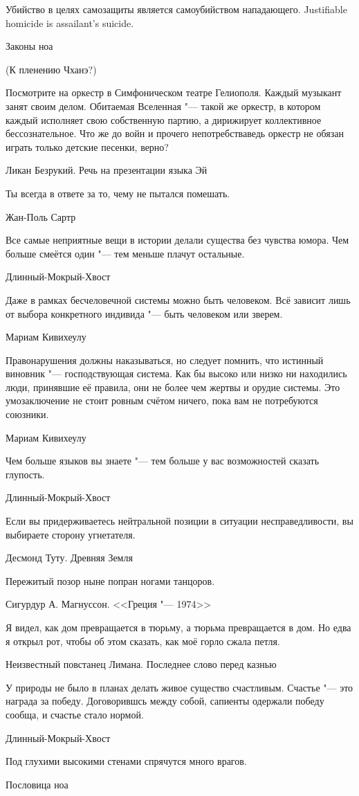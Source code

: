 \epigraph{
{Убийство в целях самозащиты является самоубийством нападающего.}
{Justifiable homicide is assailant's suicide.}
}{Законы ноа}

(К пленению Чханэ?)

\epigraph
{Посмотрите на оркестр в Симфоническом театре Гелиополя.
Каждый музыкант занят своим делом.
Обитаемая Вселенная "--- такой же оркестр, в котором каждый исполняет свою собственную партию, а дирижирует коллективное бессознательное.
Что же до войн и прочего непотребства\ldotst ведь оркестр не обязан играть только детские песенки, верно?}
{Ликан Безрукий.
Речь на презентации языка Эй}

\epigraph
{Ты всегда в ответе за то, чему не пытался помешать.}
{Жан-Поль Сартр}

\epigraph
{Все самые неприятные вещи в истории делали существа без чувства юмора.
Чем больше смеётся один "--- тем меньше плачут остальные.}
{Длинный-Мокрый-Хвост}

\epigraph
{Даже в рамках бесчеловечной системы можно быть человеком.
Всё зависит лишь от выбора конкретного индивида "--- быть человеком или зверем.}
{Мариам Кивихеулу}

\epigraph
{Правонарушения должны наказываться, но следует помнить, что истинный виновник "--- господствующая система.
Как бы высоко или низко ни находились люди, принявшие её правила, они не более чем жертвы и орудие системы.
Это умозаключение не стоит ровным счётом ничего, пока вам не потребуются союзники.}
{Мариам Кивихеулу}

\epigraph
{Чем больше языков вы знаете "--- тем больше у вас возможностей сказать глупость.}
{Длинный-Мокрый-Хвост}

\epigraph
{Если вы придерживаетесь нейтральной позиции в ситуации несправедливости, вы выбираете сторону угнетателя.}
{Десмонд Туту. Древняя Земля}

\epigraph
{Пережитый позор ныне попран ногами танцоров.}
{Сигурдур А. Магнуссон. <<Греция "--- 1974>>}

\epigraph
{Я видел, как дом превращается в тюрьму, а тюрьма превращается в дом.
Но едва я открыл рот, чтобы об этом сказать, как моё горло сжала петля.}
{Неизвестный повстанец Лимана.
Последнее слово перед казнью}

\epigraph{У природы не было в планах делать живое существо счастливым.
Счастье "--- это награда за победу.
Договорившсь между собой, сапиенты одержали победу сообща, и счастье стало нормой.}
{Длинный-Мокрый-Хвост}

\epigraph{Под глухими высокими стенами спрячутся много врагов.}
{Пословица ноа}

